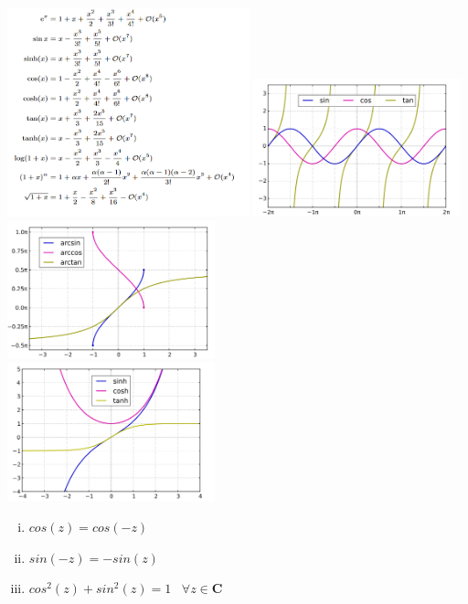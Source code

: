\documentclass[8pt]{extarticle}
\begin{document}
\begin{multicols*}{3}
\includegraphics[width=7cm]{taylor.png}
\includegraphics[width=6cm]{sincostan.png}\\
\includegraphics[width=6cm]{arcsinArccosArctan.png}\\
\includegraphics[width=6cm]{sinhCoshTanh.png}


\begin{enumerate}[(i)]
  \item $cos(z) = cos(-z)$
  \item $sin(-z) = -sin(z)$
  \item $cos^2(z) + sin^2(z) = 1 \;\;\; \forall z \in \mathbf{C}$
\end{enumerate}



\end{multicols*}
\end{document}
